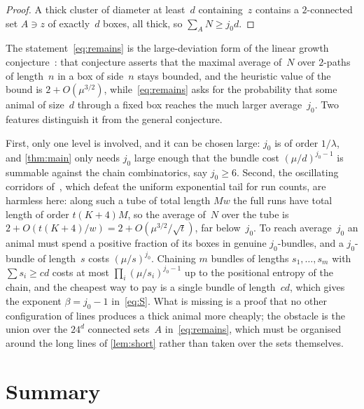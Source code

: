 \documentclass[11pt,letterpaper]{article}
\begin{document}
\begin{proof}
A thick cluster of diameter at least~$d$ containing~$z$ contains a $2$-connected set $A\ni z$ of exactly~$d$ boxes, all thick, so $\sum_AN\ge j_0d$.
\end{proof}

The statement~\eqref{eq:remains} is the large-deviation form of the linear growth conjecture~\cite[Conjecture~1.2]{GA26}: that conjecture asserts that the maximal average of~$N$ over $2$-paths of length~$n$ in a box of side~$n$ stays bounded, and the heuristic value of the bound is $2+O(\mu^{3/2})$, while~\eqref{eq:remains} asks for the probability that some animal of size~$d$ through a fixed box reaches the much larger average~$j_0$. Two features distinguish it from the general conjecture.

First, only one level is involved, and it can be chosen large: $j_0$ is of order $1/\lambda$, and \cref{thm:main} only needs $j_0$ large enough that the bundle cost $(\mu/d)^{j_0-1}$ is summable against the chain combinatorics, say $j_0\ge6$. Second, the oscillating corridors of~\cite{OSC26}, which defeat the uniform exponential tail for run counts, are harmless here: along such a tube of total length $M w$ the full runs have total length of order $t(K+4)M$, so the average of~$N$ over the tube is $2+O(t(K+4)/w)=2+O(\mu^{3/2}/\sqrt t)$, far below~$j_0$. To reach average~$j_0$ an animal must spend a positive fraction of its boxes in genuine $j_0$-bundles, and a $j_0$-bundle of length~$s$ costs $(\mu/s)^{j_0}$. Chaining $m$ bundles of lengths $s_1,\dots,s_m$ with $\sum s_i\ge cd$ costs at most $\prod_i(\mu/s_i)^{j_0-1}$ up to the positional entropy of the chain, and the cheapest way to pay is a single bundle of length~$cd$, which gives the exponent $\beta=j_0-1$ in~\eqref{eq:S}. What is missing is a proof that no other configuration of lines produces a thick animal more cheaply; the obstacle is the union over the $24^d$ connected sets~$A$ in~\eqref{eq:remains}, which must be organised around the long lines of \cref{lem:short} rather than taken over the sets themselves.

\section{Summary}
\label{sec:summary}
\end{document}
